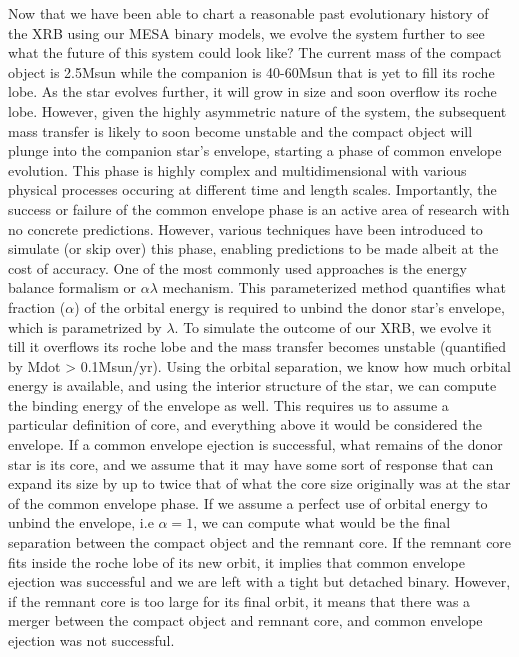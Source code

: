 \documentclass[linenumbers,trackchanges,twocolumn]{aastex701}
\begin{document}
Now that we have been able to chart a reasonable past evolutionary history of the XRB using our MESA binary models, we evolve the system further to see what the future of this system could look like? The current mass of the compact object is 2.5Msun while the companion is 40-60Msun that is yet to fill its roche lobe. As the star evolves further, it will grow in size and soon overflow its roche lobe. However, given the highly asymmetric nature of the system, the subsequent mass transfer is likely to soon become unstable and the compact object will plunge into the companion star's envelope, starting a phase of common envelope evolution. This phase is highly complex and multidimensional with various physical processes occuring at different time and length scales. Importantly, the success or failure of the common envelope phase is an active area of research with no concrete predictions. However, various techniques have been introduced to simulate (or skip over) this phase, enabling predictions to be made albeit at the cost of accuracy. One of the most commonly used approaches is the energy balance formalism or $\alpha \lambda$ mechanism. This parameterized method quantifies what fraction ($\alpha$) of the orbital energy is required to unbind the donor star's envelope, which is parametrized by $\lambda$. To simulate the outcome of our XRB, we evolve it till it overflows its roche lobe and the mass transfer becomes unstable (quantified by Mdot > 0.1Msun/yr). Using the orbital separation, we know how much orbital energy is available, and using the interior structure of the star, we can compute the binding energy of the envelope as well. This requires us to assume a particular definition of core, and everything above it would be considered the envelope. If a common envelope ejection is successful, what remains of the donor star is its core, and we assume that it may have some sort of response that can expand its size by up to twice that of what the core size originally was at the star of the common envelope phase. If we assume a perfect use of orbital energy to unbind the envelope, i.e $\alpha=1$, we can compute what would be the final separation between the compact object and the remnant core. If the remnant core fits inside the roche lobe of its new orbit, it implies that common envelope ejection was successful and we are left with a tight but detached binary. However, if the remnant core is too large for its final orbit, it means that there was a merger between the compact object and remnant core, and common envelope ejection was not successful. 
\end{document}
